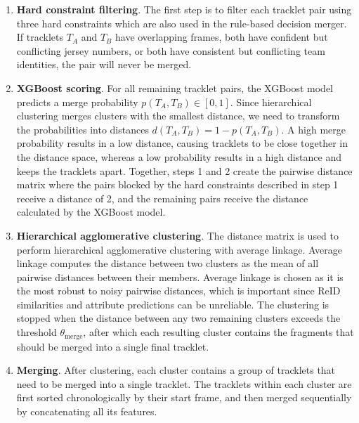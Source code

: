 \begin{enumerate}
    \item \textbf{Hard constraint filtering}. The first step is to filter each tracklet pair using three hard constraints which are also used in the rule-based decision merger. If tracklets $T_A$ and $T_B$ have overlapping frames, both have confident but conflicting jersey numbers, or both have consistent but conflicting team identities, the pair will never be merged. 
    
    \item \textbf{XGBoost scoring}. For all remaining tracklet pairs, the XGBoost model predicts a merge probability $p(T_A,T_B) \in [0,1]$. Since hierarchical clustering merges clusters with the smallest distance, we need to transform the probabilities into distances $d(T_A,T_B) = 1-p(T_A,T_B)$. A high merge probability results in a low distance, causing tracklets to be close together in the distance space, whereas a low probability results in a high distance and keeps the tracklets apart. Together, steps 1 and 2 create the pairwise distance matrix where the pairs blocked by the hard constraints described in step 1 receive a distance of 2, and the remaining pairs receive the distance calculated by the XGBoost model.
    
    \item \textbf{Hierarchical agglomerative clustering}. The distance matrix is used to perform hierarchical agglomerative clustering with average linkage. Average linkage computes the distance between two clusters as the mean of all pairwise distances between their members. Average linkage is chosen as it is the most robust to noisy pairwise distances, which is important since ReID similarities and attribute predictions can be unreliable. The clustering is stopped when the distance between any two remaining clusters exceeds the threshold $\theta_\text{merge}$, after which each resulting cluster contains the fragments that should be merged into a single final tracklet. 
    
    \item \textbf{Merging}. After clustering, each cluster contains a group of tracklets that need to be merged into a single tracklet. The tracklets within each cluster are first sorted chronologically by their start frame, and then merged sequentially by concatenating all its features. 
\end{enumerate}

